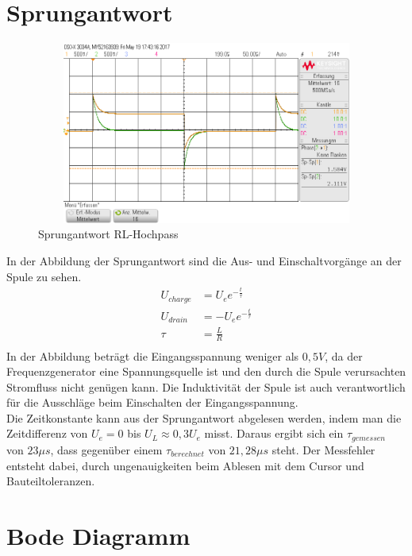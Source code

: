 \section{Sprungantwort}
\begin{figure}[H]
 \begin{center}
  \includegraphics[height=6cm,width=12cm]{Oszi_Bilder/RL_Sprung}
 \end{center}
 \caption{Sprungantwort RL-Hochpass}
\end{figure}
\noindent
In der Abbildung der Sprungantwort sind die Aus- und Einschaltvorgänge an der Spule zu sehen. \\
\begin{align*}
 U_{charge} &= U_e e^{-\frac{t}{\tau}}\\
 U_{drain} &= -U_e e^{-\frac{t}{\tau}}\\
 \tau &= \frac{L}{R}\\
\end{align*}
\noindent
In der Abbildung beträgt die Eingangsspannung weniger als $0,5V$, da der Frequenzgenerator eine Spannungsquelle ist und den durch die Spule verursachten Stromfluss
nicht genügen kann. Die Induktivität der Spule ist auch verantwortlich für die Ausschläge beim Einschalten der Eingangsspannung. \\
Die Zeitkonstante kann aus der Sprungantwort abgelesen werden, indem man die Zeitdifferenz von $U_e=0$ bis $U_L \approx 0,3U_e$ misst. Daraus ergibt
sich ein $\tau_{gemessen}$ von $23\mu s$, dass gegenüber einem $\tau_{berechnet}$ von $21,28\mu s$ steht. Der Messfehler entsteht dabei, durch ungenauigkeiten
beim Ablesen mit dem Cursor und Bauteiltoleranzen.\\

\section{Bode Diagramm}

